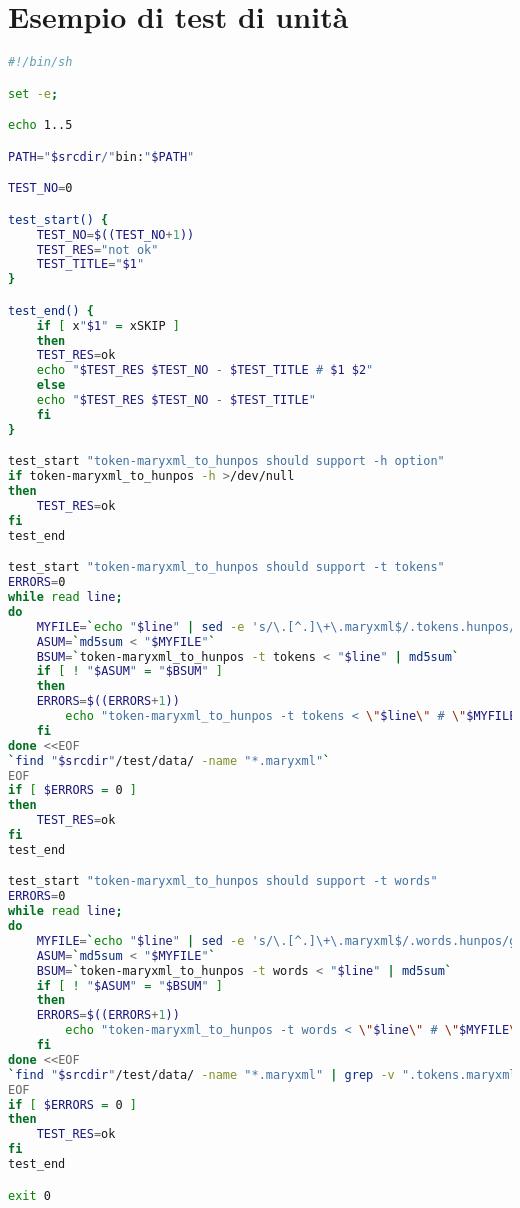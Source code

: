 
\chapter{Esempio di test di unità}
\label{app:unit-test}

\begin{lstlisting}[language=bash]
#!/bin/sh

set -e;

echo 1..5

PATH="$srcdir/"bin:"$PATH"

TEST_NO=0

test_start() {
    TEST_NO=$((TEST_NO+1))
    TEST_RES="not ok"
    TEST_TITLE="$1"
}

test_end() {
    if [ x"$1" = xSKIP ]
    then
	TEST_RES=ok
	echo "$TEST_RES $TEST_NO - $TEST_TITLE # $1 $2"
    else
	echo "$TEST_RES $TEST_NO - $TEST_TITLE"
    fi
}

test_start "token-maryxml_to_hunpos should support -h option"
if token-maryxml_to_hunpos -h >/dev/null
then
    TEST_RES=ok
fi
test_end

test_start "token-maryxml_to_hunpos should support -t tokens"
ERRORS=0
while read line;
do
    MYFILE=`echo "$line" | sed -e 's/\.[^.]\+\.maryxml$/.tokens.hunpos/g'`;
    ASUM=`md5sum < "$MYFILE"`
    BSUM=`token-maryxml_to_hunpos -t tokens < "$line" | md5sum`
    if [ ! "$ASUM" = "$BSUM" ]
    then
	ERRORS=$((ERRORS+1))
        echo "token-maryxml_to_hunpos -t tokens < \"$line\" # \"$MYFILE\"" >&2
    fi
done <<EOF
`find "$srcdir"/test/data/ -name "*.maryxml"`
EOF
if [ $ERRORS = 0 ]
then
    TEST_RES=ok
fi
test_end

test_start "token-maryxml_to_hunpos should support -t words"
ERRORS=0
while read line;
do
    MYFILE=`echo "$line" | sed -e 's/\.[^.]\+\.maryxml$/.words.hunpos/g'`;
    ASUM=`md5sum < "$MYFILE"`
    BSUM=`token-maryxml_to_hunpos -t words < "$line" | md5sum`
    if [ ! "$ASUM" = "$BSUM" ]
    then
	ERRORS=$((ERRORS+1))
        echo "token-maryxml_to_hunpos -t words < \"$line\" # \"$MYFILE\"" >&2
    fi
done <<EOF
`find "$srcdir"/test/data/ -name "*.maryxml" | grep -v ".tokens.maryxml"`
EOF
if [ $ERRORS = 0 ]
then
    TEST_RES=ok
fi
test_end

exit 0

\end{lstlisting}



